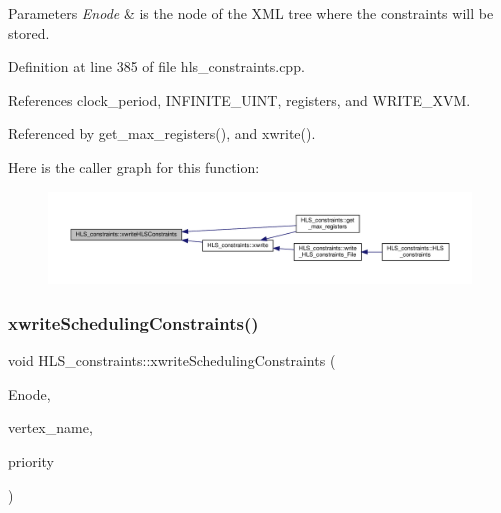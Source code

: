\begin{DoxyParams}{Parameters}
{\em Enode} & is the node of the X\+ML tree where the constraints will be stored. \\
\hline
\end{DoxyParams}


Definition at line 385 of file hls\+\_\+constraints.\+cpp.



References clock\+\_\+period, I\+N\+F\+I\+N\+I\+T\+E\+\_\+\+U\+I\+NT, registers, and W\+R\+I\+T\+E\+\_\+\+X\+VM.



Referenced by get\+\_\+max\+\_\+registers(), and xwrite().

Here is the caller graph for this function\+:
\nopagebreak
\begin{figure}[H]
\begin{center}
\leavevmode
\includegraphics[width=350pt]{dd/d96/classHLS__constraints_af924912aeb49636faa808c66697bd1cb_icgraph}
\end{center}
\end{figure}
\mbox{\label{classHLS__constraints_a863dabf331d4e0642f829e25ded9b6b5}} 
\subsubsection{\texorpdfstring{xwrite\+Scheduling\+Constraints()}{xwriteSchedulingConstraints()}}
{\footnotesize\ttfamily void H\+L\+S\+\_\+constraints\+::xwrite\+Scheduling\+Constraints (\begin{DoxyParamCaption}\item[{\hyperlink{classxml__element}{xml\+\_\+element} $\ast$}]{Enode,  }\item[{const std\+::string \&}]{vertex\+\_\+name,  }\item[{int}]{priority }\end{DoxyParamCaption})}



